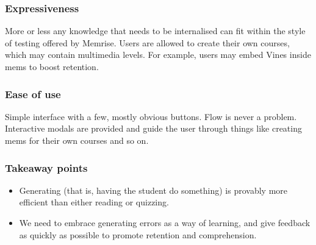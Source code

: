 \subsubsection{Expressiveness}

More or less any knowledge that needs to be internalised can fit within the
style of testing offered by Memrise. Users are allowed to create their own
courses, which may contain multimedia levels. For example, users may embed Vines
inside mems to boost retention. 

\subsubsection{Ease of use}

Simple interface with a few, mostly obvious buttons. Flow is never a problem.
Interactive modals are provided and guide the user through things like creating
mems for their own courses and so on.

\subsubsection{Takeaway points}

\begin{itemize}
\item Generating (that is, having the student do something) is provably more
  efficient than either reading or quizzing.
\item We need to embrace generating errors as a way of learning, and give feedback
  as quickly as possible to promote retention and comprehension.
\end{itemize}

